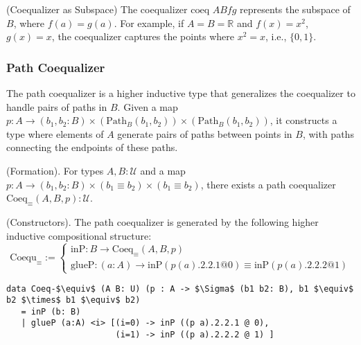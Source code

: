 \begin{example} (Coequalizer as Subspace)
The coequalizer \( \text{coeq } A B f g \) represents the subspace
of \( B \), where \( f(a) = g(a) \). For example, if \( A = B = \mathbb{R} \)
and \( f(x) = x^2 \), \( g(x) = x \), the coequalizer captures the points
where \( x^2 = x \), i.e., \( \{0, 1\} \).
\end{example}

\newpage
\subsubsection*{Path Coequalizer}
The path coequalizer is a higher inductive type that generalizes
the coequalizer to handle pairs of paths in \( B \). Given
a map \( p : A \to (b_1, b_2 : B) \times (\text{Path}_B (b_1, b_2)) \times (\text{Path}_B (b_1, b_2)) \),
it constructs a type where elements of \( A \) generate pairs
of paths between points in \( B \), with paths connecting
the endpoints of these paths.

\begin{definition} (Formation).
For types \( A, B : \mathcal{U} \) and a map \( p : A \to (b_1, b_2 : B) \times (b_1 \equiv b_2) \times (b_1 \equiv b_2) \),
there exists a path coequalizer \( \text{Coeq}_\equiv(A,B,p) : \mathcal{U} \).
\end{definition}

\begin{definition} (Constructors).
The path coequalizer is generated by the following higher inductive compositional structure:
\[
\text{Coequ}_\equiv :=
\begin{cases}
\text{inP} : B \to \text{Coeq}_\equiv(A,B,p) \\
\text{glueP} : (a : A) \to \text{inP}(p(a).2.2.1 @ 0) \equiv \text{inP}(p(a).2.2.2 @ 1)
\end{cases}
\]
\begin{lstlisting}[mathescape=true]
data Coeq-$\equiv$ (A B: U) (p : A -> $\Sigma$ (b1 b2: B), b1 $\equiv$ b2 $\times$ b1 $\equiv$ b2)
   = inP (b: B)
   | glueP (a:A) <i> [(i=0) -> inP ((p a).2.2.1 @ 0),
                      (i=1) -> inP ((p a).2.2.2 @ 1) ]
\end{lstlisting}
\end{definition}

